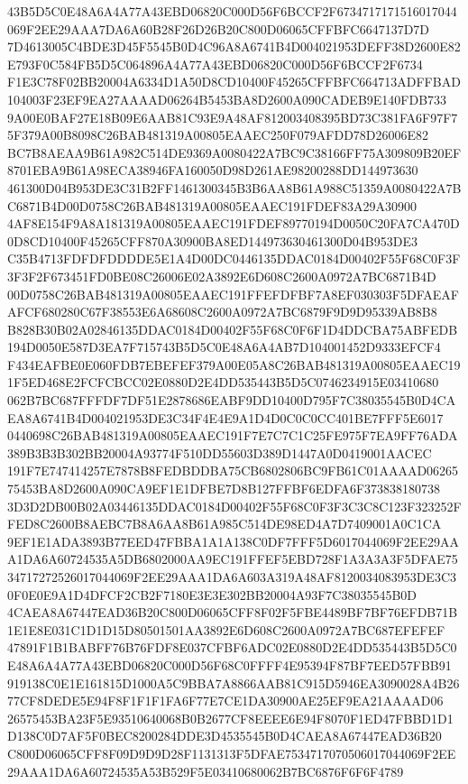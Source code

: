 \documentclass[UTF8,fontset=fandol,zihao=-4,a4paper]{ctexart}
\begin{document}
{{43B5D5C0E48A6A4A77A43EBD06820C000D56F6BCCF2F6734717171516017044069F2EE29AAA7DA6A60B28F26D26B20C800D06065CFFBFC6647137D7D
7D4613005C4BDE3D45F5545B0D4C96A8A6741B4D004021953DEFF38D2600E82E793F0C584FB5D5C064896A4A77A43EBD06820C000D56F6BCCF2F6734
F1E3C78F02BB20004A6334D1A50D8CD10400F45265CFFBFC664713ADFFBAD104003F23EF9EA27AAAAD06264B5453BA8D2600A090CADEB9E140FDB733
9A00E0BAF27E18B09E6AAB81C93E9A48AF812003408395BD73C381FA6F97F75F379A00B8098C26BAB481319A00805EAAEC250F079AFDD78D26006E82
BC7B8AEAA9B61A982C514DE9369A0080422A7BC9C38166FF75A309809B20EF8701EBA9B61A98ECA38946FA160050D98D261AE98200288DD144973630
461300D04B953DE3C31B2FF1461300345B3B6AA8B61A988C51359A0080422A7BC6871B4D00D0758C26BAB481319A00805EAAEC191FDEF83A29A30900
4AF8E154F9A8A181319A00805EAAEC191FDEF89770194D0050C20FA7CA470D0D8CD10400F45265CFF870A30900BA8ED144973630461300D04B953DE3
C35B4713FDFDFDDDDE5E1A4D00DC0446135DDAC0184D00402F55F68C0F3F3F3F2F673451FD0BE08C26006E02A3892E6D608C2600A0972A7BC6871B4D
00D0758C26BAB481319A00805EAAEC191FFEFDFBF7A8EF030303F5DFAEAFAFCF680280C67F38553E6A68608C2600A0972A7BC6879F9D9D95339AB8B8
B828B30B02A02846135DDAC0184D00402F55F68C0F6F1D4DDCBA75ABFEDB194D0050E587D3EA7F715743B5D5C0E48A6A4AB7D104001452D9333EFCF4
F434EAFBE0E060FDB7EBEFEF379A00E05A8C26BAB481319A00805EAAEC191F5ED468E2FCFCBCC02E0880D2E4DD535443B5D5C0746234915E03410680
062B7BC687FFFDF7DF51E2878686EABF9DD10400D795F7C38035545B0D4CAEA8A6741B4D004021953DE3C34F4E4E9A1D4D0C0C0CC401BE7FFF5E6017
0440698C26BAB481319A00805EAAEC191F7E7C7C1C25FE975F7EA9FF76ADA389B3B3B302BB20004A93774F510DD55603D389D1447A0D0419001AACEC
191F7E747414257E7878B8FEDBDDBA75CB6802806BC9FB61C01AAAAD0626575453BA8D2600A090CA9EF1E1DFBE7D8B127FFBF6EDFA6F373838180738
3D3D2DB00B02A03446135DDAC0184D00402F55F68C0F3F3C3C8C123F323252FFED8C2600B8AEBC7B8A6AA8B61A985C514DE98ED4A7D7409001A0C1CA
9EF1E1ADA3893B77EED47FBBA1A1A138C0DF7FFF5D6017044069F2EE29AAA1DA6A60724535A5DB6802000AA9EC191FFEF5EBD728F1A3A3A3F5DFAE75
34717272526017044069F2EE29AAA1DA6A603A319A48AF8120034083953DE3C30F0E0E9A1D4DFCF2CB2F7180E3E3E302BB20004A93F7C38035545B0D
4CAEA8A67447EAD36B20C800D06065CFF8F02F5FBE4489BF7BF76EFDB71B1E1E8E031C1D1D15D80501501AA3892E6D608C2600A0972A7BC687EFEFEF
47891F1B1BABFF76B76FDF8E037CFBF6ADC02E0880D2E4DD535443B5D5C0E48A6A4A77A43EBD06820C000D56F68C0FFFF4E95394F87BF7EED57FBB91
919138C0E1E161815D1000A5C9BBA7A8866AAB81C915D5946EA3090028A4B2677CF8DEDE5E94F8F1F1F1FA6F77E7CE1DA30900AE25EF9EA21AAAAD06
26575453BA23F5E93510640068B0B2677CF8EEEE6E94F8070F1ED47FBBD1D1D138C0D7AF5F0BEC8200284DDE3D4535545B0D4CAEA8A67447EAD36B20
C800D06065CFF8F09D9D9D28F1131313F5DFAE7534717070506017044069F2EE29AAA1DA6A60724535A53B529F5E03410680062B7BC6876F6F6F4789
}}
\end{document}
